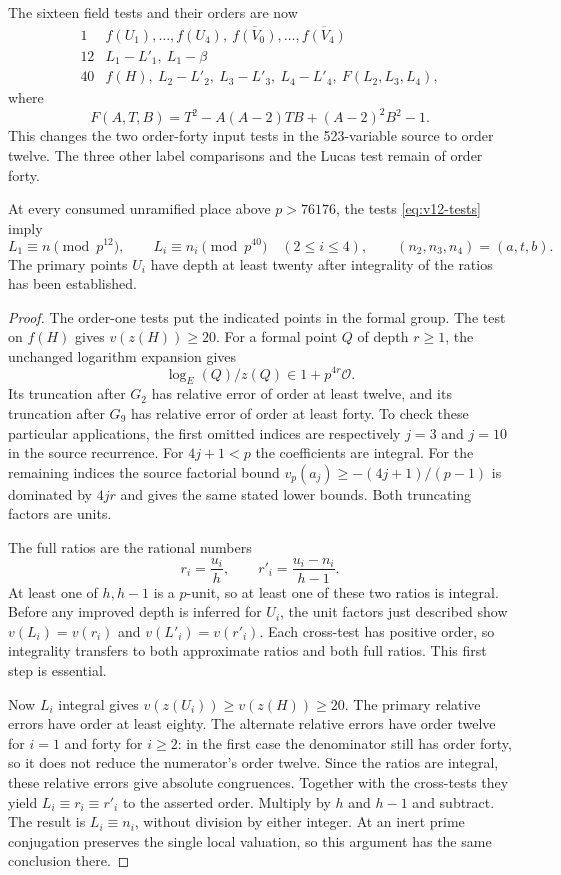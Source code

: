 The sixteen field tests and their orders are now
\begin{equation}\label{eq:v12-tests}
\begin{array}{c|l}
1&f(U_1),\ldots,f(U_4),\ \overline{f(V_0)},\ldots,\overline{f(V_4)}\\[2pt]
12&L_1-L'_1,\ L_1-\beta\\[2pt]
40&f(H),\ L_2-L'_2,\ L_3-L'_3,\ L_4-L'_4,\ F(L_2,L_3,L_4),
\end{array}
\end{equation}
where
\[
 F(A,T,B)=T^2-A(A-2)TB+(A-2)^2B^2-1.
\]
This changes the two order-forty input tests in the 523-variable
source to order twelve.  The three other label comparisons and the
Lucas test remain of order forty.

\begin{lemma}\label{lem:v12-mixed-local}
At every consumed unramified place above $p>76176$, the tests
\eqref{eq:v12-tests} imply
\[
 L_1\equiv n\pmod {p^{12}},\qquad
 L_i\equiv n_i\pmod {p^{40}}\quad(2\le i\le4),
 \qquad(n_2,n_3,n_4)=(a,t,b).
\]
The primary points $U_i$ have depth at least twenty after integrality
of the ratios has been established.
\end{lemma}
\begin{proof}
The order-one tests put the indicated points in the formal group.
The test on $f(H)$ gives $v(z(H))\ge20$.  For a formal point $Q$ of
depth $r\ge1$, the unchanged logarithm expansion gives
\[
 \log_E(Q)/z(Q)\in1+p^{4r}\mathcal O.
\]
Its truncation after $G_2$ has relative error of order at least twelve,
and its truncation after $G_9$ has relative error of order at least
forty.  To check these particular applications, the first omitted
indices are respectively $j=3$ and $j=10$ in the source recurrence.
For $4j+1<p$ the coefficients are integral.  For the remaining indices
the source factorial bound
$v_p(a_j)\ge-(4j+1)/(p-1)$ is dominated by $4jr$ and gives the same
stated lower bounds.  Both truncating factors are units.

The full ratios are the rational numbers
\[
 r_i=\frac{u_i}{h},\qquad r'_i=\frac{u_i-n_i}{h-1}.
\]
At least one of $h,h-1$ is a $p$-unit, so at least one of these two
ratios is integral.  Before any improved depth is inferred for $U_i$,
the unit factors just described show
$v(L_i)=v(r_i)$ and $v(L'_i)=v(r'_i)$.  Each cross-test has positive
order, so integrality transfers to both approximate ratios and both
full ratios.  This first step is essential.

Now $L_i$ integral gives $v(z(U_i))\ge v(z(H))\ge20$.
The primary relative errors have order at least eighty.  The alternate
relative errors have order twelve for $i=1$ and forty for $i\ge2$:
in the first case the denominator still has order forty, so it does
not reduce the numerator's order twelve.  Since the ratios are
integral, these relative errors give absolute congruences.  Together
with the cross-tests they yield $L_i\equiv r_i\equiv r'_i$ to the
asserted order.  Multiply by $h$ and $h-1$ and subtract.  The result
is $L_i\equiv n_i$, without division by either integer.  At an inert
prime conjugation preserves the single local valuation, so this
argument has the same conclusion there.
\end{proof}


